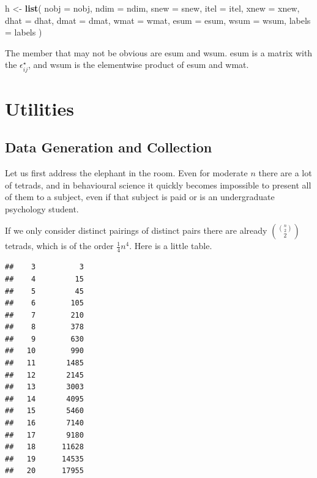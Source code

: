 \documentclass[
  12pt,
]{article}
\newenvironment{Shaded}{\begin{snugshade}}{\end{snugshade}}
\newcommand{\AttributeTok}[1]{\textcolor[rgb]{0.13,0.29,0.53}{#1}}
\newcommand{\FunctionTok}[1]{\textcolor[rgb]{0.13,0.29,0.53}{\textbf{#1}}}
\newcommand{\NormalTok}[1]{#1}
\newcommand{\OtherTok}[1]{\textcolor[rgb]{0.56,0.35,0.01}{#1}}
\begin{document}
\begin{Shaded}
\begin{Highlighting}[]
\NormalTok{  h }\OtherTok{\textless{}{-}} \FunctionTok{list}\NormalTok{(}
    \AttributeTok{nobj =}\NormalTok{ nobj,}
    \AttributeTok{ndim =}\NormalTok{ ndim,}
    \AttributeTok{snew =}\NormalTok{ snew,}
    \AttributeTok{itel =}\NormalTok{ itel,}
    \AttributeTok{xnew =}\NormalTok{ xnew,}
    \AttributeTok{dhat =}\NormalTok{ dhat,}
    \AttributeTok{dmat =}\NormalTok{ dmat,}
    \AttributeTok{wmat =}\NormalTok{ wmat,}
    \AttributeTok{esum =}\NormalTok{ esum,}
    \AttributeTok{wsum =}\NormalTok{ wsum,}
    \AttributeTok{labels =}\NormalTok{ labels}
\NormalTok{  )}
\end{Highlighting}
\end{Shaded}

The member that may not be obvious are esum and wsum. esum is a matrix with the
\(\epsilon_{ij}^\star\), and wsum is the elementwise product of esum and wmat.

\section{Utilities}\label{utilities}

\subsection{Data Generation and Collection}\label{data-generation-and-collection}

Let us first address the elephant in the room. Even for moderate \(n\) there are a
lot of tetrads, and in behavioural science it quickly becomes impossible to present all of them to a subject, even if that subject is paid or is an undergraduate psychology student.

If we only consider distinct pairings of distinct pairs there are already
\(\binom{\binom{n}{2}}{2}\)
tetrads, which is of the order \(\frac14n^4\). Here is a little table.

\begin{verbatim}
##    3          3 
##    4         15 
##    5         45 
##    6        105 
##    7        210 
##    8        378 
##    9        630 
##   10        990 
##   11       1485 
##   12       2145 
##   13       3003 
##   14       4095 
##   15       5460 
##   16       7140 
##   17       9180 
##   18      11628 
##   19      14535 
##   20      17955
\end{verbatim}
\end{document}
